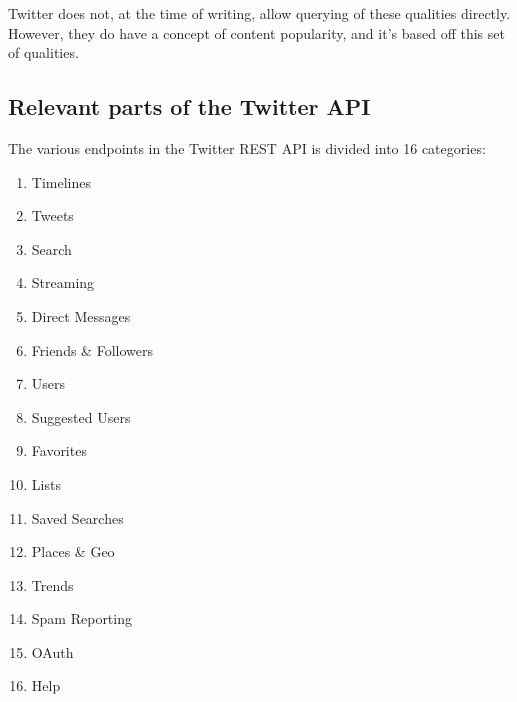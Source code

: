% 

Twitter does not, at the time of writing, allow querying of these qualities directly. However, they do have a concept of content popularity, and it's based off this set of qualities.

\subsection{Relevant parts of the Twitter API} %
\label{sub:relevant_parts_of_the_twitter_api}

The various endpoints in the Twitter REST API is divided into 16 categories:

\begin{enumerate}
  \item Timelines
  \item Tweets
  \item Search
  \item Streaming
  \item Direct Messages
  \item Friends & Followers
  \item Users
  \item Suggested Users
  \item Favorites
  \item Lists
  \item Saved Searches
  \item Places & Geo
  \item Trends
  \item Spam Reporting
  \item OAuth
  \item Help
\end{enumerate}

